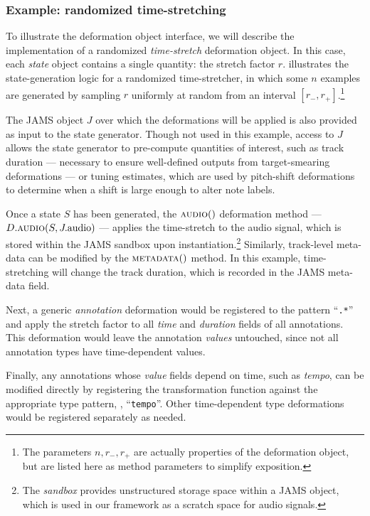 \documentclass{article}
\begin{document}
\subsubsection{Example: randomized time-stretching}
\label{deformer-example}
To illustrate the deformation object interface, we will describe the implementation of a 
randomized \emph{time-stretch} deformation object.
In this case, each \emph{state} object contains a single quantity: the stretch factor $r$.
 illustrates the state-generation logic for a randomized
time-stretcher, in which some $n$ examples are generated by sampling $r$ uniformly at
random from an interval $[r_-, r_+]$.\footnote{The parameters $n, r_-, r_+$ are actually
    properties of the deformation object, but are listed here as method parameters to
simplify exposition.}

The JAMS object $J$ over which the deformations will be applied is also provided as input 
to the state generator.  Though not used in this example, access to $J$ allows the state generator
to pre-compute quantities of interest, such as track duration 
 --- necessary to ensure well-defined outputs from target-smearing deformations --- 
or tuning estimates, which are used by pitch-shift deformations to 
determine when a shift is large enough to 
alter note labels.

Once a state $S$ has been generated, the $\Call{audio}$ deformation method
--- $D.\Call{audio}{S, J.\text{audio}}$ --- 
applies the time-stretch to the audio signal, which is stored within the
JAMS sandbox upon instantiation.\footnote{The \emph{sandbox} provides unstructured
storage space within a JAMS object, which is used in our framework as a scratch space for
audio signals.}  Similarly, track-level meta-data can be modified by the $\Call{metadata}$
method.  In this example, time-stretching will change the track duration, which is recorded
in the JAMS meta-data field.

Next, a generic \emph{annotation} deformation would be registered to the pattern
``\texttt{.*}'' and apply the stretch factor to all \emph{time} and \emph{duration}
fields of all annotations.  This deformation would leave the annotation
\emph{values} untouched, since not all annotation types have time-dependent values.

Finally, any annotations whose \emph{value} fields depend on time, such as \emph{tempo},
can be modified directly by registering the transformation function against the
appropriate type pattern, \eg, ``\texttt{tempo}''.  Other time-dependent type
deformations would be registered separately as needed.
\end{document}
